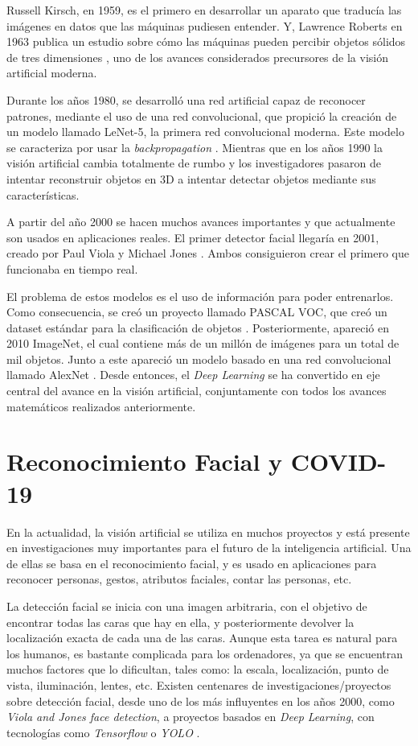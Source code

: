 Russell Kirsch, en 1959, es el primero en desarrollar un aparato que traducía las imágenes en datos que las máquinas pudiesen entender. Y, Lawrence Roberts en 1963 publica un estudio sobre cómo las máquinas pueden percibir objetos sólidos de tres dimensiones \cite{histComputer}, uno de los avances considerados precursores de la visión artificial moderna.

Durante los años 1980, se desarrolló una red artificial capaz de reconocer patrones, mediante el uso de una red convolucional, que propició la creación de un modelo llamado LeNet-5, la primera red convolucional moderna. Este modelo se caracteriza por usar la \textit{backpropagation} \cite{histComputer}. Mientras que en los años 1990 la visión artificial cambia totalmente de rumbo y los investigadores pasaron de intentar reconstruir objetos en 3D a intentar detectar objetos mediante sus características.

A partir del año 2000 se hacen muchos avances importantes y que actualmente son usados en aplicaciones reales. El primer detector facial llegaría en 2001, creado por Paul Viola y Michael Jones \cite{paulViola}. Ambos consiguieron crear el primero que funcionaba en tiempo real.

El problema de estos modelos es el uso de información para poder entrenarlos. Como consecuencia, se creó un proyecto llamado PASCAL VOC, que creó un dataset estándar para la clasificación de objetos \cite{pascalVOC}. Posteriormente, apareció en 2010 ImageNet, el cual contiene más de un millón de imágenes para un total de mil objetos. Junto a este apareció un modelo basado en una red convolucional llamado AlexNet \cite{krizhevsky2014weird}. Desde entonces, el \textit{Deep Learning} se ha convertido en eje central del avance en la visión artificial, conjuntamente con todos los avances matemáticos realizados anteriormente.

\section{Reconocimiento Facial y COVID-19}

En la actualidad, la visión artificial se utiliza en muchos proyectos y está presente en investigaciones muy importantes para el futuro de la inteligencia artificial. Una de ellas se basa en el reconocimiento facial, y es usado en aplicaciones para reconocer personas, gestos, atributos faciales, contar las personas, etc. 

La detección facial se inicia con una imagen arbitraria, con el objetivo de encontrar todas las caras que hay en ella, y posteriormente devolver la localización exacta de cada una de las caras. Aunque esta tarea es natural para los humanos, es bastante complicada para los ordenadores, ya que se encuentran muchos factores que lo dificultan, tales como: la escala, localización, punto de vista, iluminación, lentes, etc. Existen centenares de investigaciones/proyectos sobre detección facial, desde uno de los más influyentes en los años 2000, como \textit{Viola and Jones face detection}, a proyectos basados en \textit{Deep Learning}, con tecnologías como \textit{Tensorflow} o \textit{YOLO} \cite{szeliski_2018}. 


